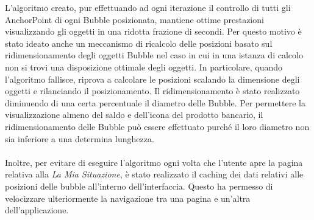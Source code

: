 L'algoritmo creato, pur effettuando ad ogni iterazione il controllo di tutti gli AnchorPoint di ogni Bubble posizionata, mantiene ottime prestazioni visualizzando gli oggetti in una ridotta frazione di secondi. Per questo motivo è stato ideato anche un meccanismo di ricalcolo delle posizioni basato sul ridimensionamento degli oggetti Bubble nel caso in cui in una istanza di calcolo non si trovi una disposizione ottimale degli oggetti.  
In particolare, quando l'algoritmo fallisce, riprova a calcolare le posizioni scalando la dimensione degli oggetti e rilanciando il posizionamento. Il ridimensionamento è stato realizzato diminuendo di una certa percentuale il diametro delle Bubble. Per permettere la visualizzazione almeno del saldo e dell'icona del prodotto bancario, il ridimensionamento delle Bubble può essere effettuato purché il loro diametro non sia inferiore a una determina lunghezza.
\\\\
Inoltre, per evitare di eseguire l'algoritmo ogni volta che l'utente apre la pagina relativa alla \emph{La Mia Situazione}, è stato realizzato il caching dei dati relativi alle posizioni delle bubble all'interno dell'interfaccia. Questo ha permesso di velocizzare ulteriormente la navigazione tra una pagina e un'altra dell'applicazione.
